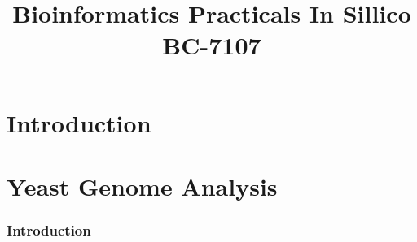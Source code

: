 \documentclass[10pt,a4paper]{article}
\title{\Large Bioinformatics Practicals In Sillico \\ \textbf{\normalsize BC-7107}}
\author{\authors}
\begin{document}
\maketitle
\newpage

\part*{Introduction}





\newpage
\part*{Yeast Genome Analysis}

\section*{Introduction}
\end{document}
